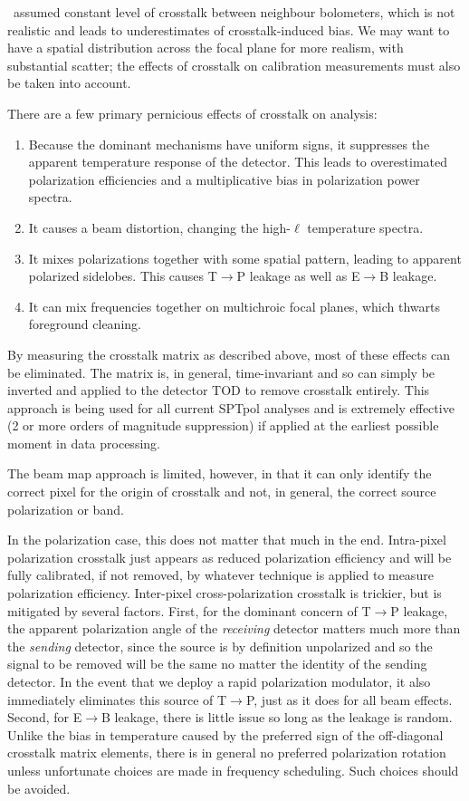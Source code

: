 \pb\ assumed constant level of crosstalk between neighbour bolometers, which is not realistic and leads to underestimates of crosstalk-induced bias.
We may want to have a spatial distribution across the focal plane for more realism, with substantial scatter; the effects of crosstalk on calibration measurements must also be taken into account.

There are a few primary pernicious effects of crosstalk on analysis:
\begin{enumerate}
\item{Because the dominant mechanisms have uniform signs, it suppresses the apparent temperature response of the detector. This leads to overestimated polarization efficiencies and a multiplicative bias in polarization power spectra.}
\item{It causes a beam distortion, changing the high-$\ell$ temperature spectra.}
\item{It mixes polarizations together with some spatial pattern, leading to apparent polarized sidelobes. This causes T$\rightarrow$P leakage as well as E$\rightarrow$B leakage.}
\item{It can mix frequencies together on multichroic focal planes, which thwarts foreground cleaning.}
\end{enumerate}

By measuring the crosstalk matrix as described above, most of these effects can be eliminated.
The matrix is, in general, time-invariant and so can simply be inverted and applied to the detector TOD to remove crosstalk entirely.
This approach is being used for all current SPTpol analyses and is extremely effective (2 or more orders of magnitude suppression) if applied at the earliest possible moment in data processing.

The beam map approach is limited, however, in that it can only identify the correct pixel for the origin of crosstalk and not, in general, the correct source polarization or band.

In the polarization case, this does not matter that much in the end.
Intra-pixel polarization crosstalk just appears as reduced polarization efficiency and will be fully calibrated, if not removed, by whatever technique is applied to measure polarization efficiency.
Inter-pixel cross-polarization crosstalk is trickier, but is mitigated by several factors.
First, for the dominant concern of T$\rightarrow$P leakage, the apparent polarization angle of the \emph{receiving} detector matters much more than the \emph{sending} detector, since the source is by definition unpolarized and so the signal to be removed will be the same no matter the identity of the sending detector.
In the event that we deploy a rapid polarization modulator, it also immediately eliminates this source of T$\rightarrow$P, just as it does for all beam effects.
Second, for E$\rightarrow$B leakage, there is little issue so long as the leakage is random.
Unlike the bias in temperature caused by the preferred sign of the off-diagonal crosstalk matrix elements, there is in general no preferred polarization rotation unless unfortunate choices are made in frequency scheduling.
Such choices should be avoided.

